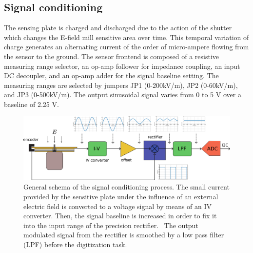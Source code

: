 \documentclass[a4paper]{jpconf}
\begin{document}
\subsection{Signal conditioning}

The sensing plate is charged and discharged due to the action of the shutter which changes the E-field mill sensitive area over time. This temporal variation of charge generates an alternating current of the order of micro-ampere flowing from the sensor to the ground. The sensor frontend is composed of a resistive measuring range selector, an op-amp follower for impedance coupling, an input DC decoupler, and an op-amp adder for the signal baseline setting. The measuring ranges are selected by jumpers JP1 (0-200kV/m), JP2 (0-60kV/m), and JP3 (0-500kV/m). The output sinusoidal signal varies from 0 to 5 V over a baseline of 2.25 V.

\begin{figure}[h]
\begin{center}
\includegraphics[width=1\textwidth]{Figures/Emill_esquema.eps}
\caption{General schema of the signal conditioning process. The small current provided by the sensitive plate under the influence of an external electric field is converted to a voltage signal by means of an IV converter. Then, the signal baseline is increased in order to fix it into the input range of the precision rectifier.  The output modulated signal from the rectifier is smoothed by a low pass filter (LPF) before the digitization task.}
\label{emill_c}
\end{center}
\end{figure}
\end{document}

